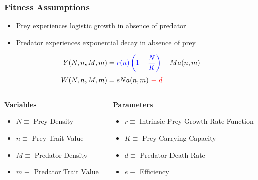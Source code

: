 \documentclass[10pt]{beamer}
\begin{document}
\begin{frame}
	\frametitle{Fitness Assumptions}
	\begin{itemize}
		\item Prey experiences {\color{blue}logistic growth} in absence of predator
		\item Predator experiences {\color{red}exponential decay} in absence of prey
	\end{itemize}
	\begin{align*}
		Y(N, n, M, m) &= {\color{blue}r(n)\left(1 - \frac{N}{K}\right)} - Ma(n, m) \\[.1cm]
		W(N, n, M, m) &= eNa(n, m)\ {\color{red}-\ d}
	\end{align*}
	\begin{columns}
		\begin{column}{0.45\textwidth}
			{\bf Variables}
			\begin{itemize}
				\item \footnotesize$N \equiv $ Prey Density
				\item $n \equiv $ Prey Trait Value
				\item $M \equiv $ Predator Density
				\item $m \equiv $ Predator Trait Value
			\end{itemize}
		\end{column}
		\begin{column}{0.55\textwidth}
			{\bf Parameters}
			\begin{itemize}
				\item \footnotesize{\color{blue}$r \equiv $ Intrinsic Prey Growth Rate Function}
				\item {\color{blue}$K \equiv $ Prey Carrying Capacity}
				\item {\color{red}$d \equiv $ Predator Death Rate}
				\item $e \equiv $ Efficiency
			\end{itemize}
		\end{column}
	\end{columns}
\end{frame}
\end{document}
